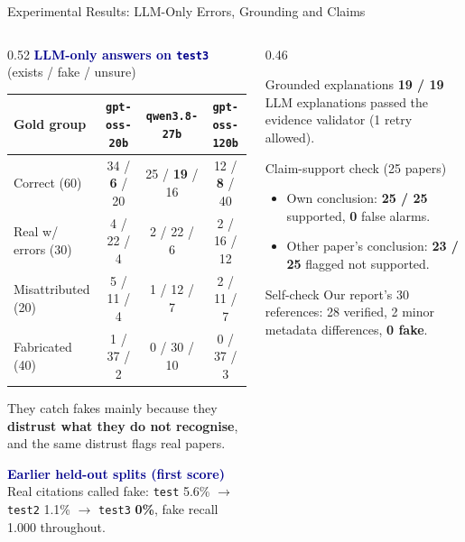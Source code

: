 \documentclass[aspectratio=169,10pt]{beamer}
\newcommand{\hl}[1]{\textcolor{accentblue}{\textbf{#1}}}
\newcommand{\bad}[1]{\textcolor{badred}{\textbf{#1}}}
\begin{document}
\begin{frame}{Experimental Results: LLM-Only Errors, Grounding and Claims}
  \begin{columns}[T]
    \begin{column}{0.52\textwidth}
      \textbf{\textcolor{darkblue}{LLM-only answers on \texttt{test3}}} \scriptsize (exists / fake / unsure)
      \vspace{2pt}

      \scriptsize
      \setlength{\tabcolsep}{3pt}
      \begin{tabular}{l ccc}
        \toprule
        Gold group & \texttt{gpt-oss-20b} & \texttt{qwen3.8-27b} & \texttt{gpt-oss-120b} \\
        \midrule
        Correct (60) & 34 / \bad{6} / 20 & 25 / \bad{19} / 16 & 12 / \bad{8} / 40 \\
        Real w/ errors (30) & 4 / 22 / 4 & 2 / 22 / 6 & 2 / 16 / 12 \\
        Misattributed (20) & 5 / 11 / 4 & 1 / 12 / 7 & 2 / 11 / 7 \\
        Fabricated (40) & 1 / 37 / 2 & 0 / 30 / 10 & 0 / 37 / 3 \\
        \bottomrule
      \end{tabular}
      \vspace{4pt}

      \small They catch fakes mainly because they \hl{distrust what they do not recognise}, and the
      same distrust flags real papers.
      \vspace{4pt}

      \textbf{\textcolor{darkblue}{Earlier held-out splits (first score)}}\\
      \scriptsize Real citations called fake: \texttt{test} 5.6\% $\rightarrow$ \texttt{test2} 1.1\%
      $\rightarrow$ \texttt{test3} \hl{0\%}, fake recall 1.000 throughout.
    \end{column}
    \begin{column}{0.46\textwidth}
      \begin{block}{Grounded explanations}
        \small \hl{19 / 19} LLM explanations passed the evidence validator (1 retry allowed).
      \end{block}
      \begin{block}{Claim-support check (25 papers)}
        \small
        \begin{itemize}
          \item Own conclusion: \hl{25 / 25} supported, \hl{0} false alarms.
          \item Other paper's conclusion: \hl{23 / 25} flagged not supported.
        \end{itemize}
      \end{block}
      \begin{exampleblock}{Self-check}
        \small Our report's 30 references: 28 verified, 2 minor metadata differences, \hl{0 fake}.
      \end{exampleblock}
    \end{column}
  \end{columns}
\end{frame}
\end{document}
